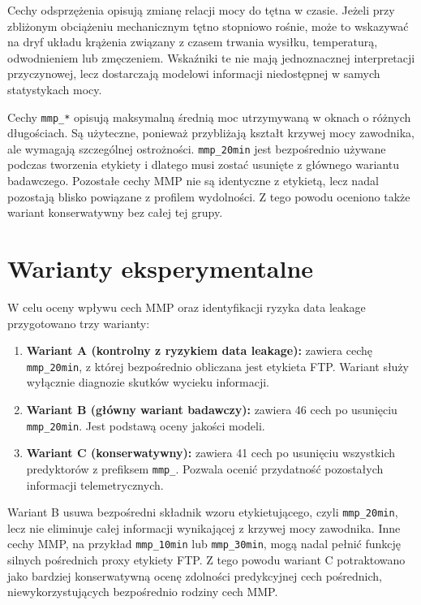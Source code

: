 Cechy odsprzężenia opisują zmianę relacji mocy do tętna w czasie. Jeżeli przy zbliżonym obciążeniu mechanicznym tętno stopniowo rośnie, może to wskazywać na dryf układu krążenia związany z czasem trwania wysiłku, temperaturą, odwodnieniem lub zmęczeniem. Wskaźniki te nie mają jednoznacznej interpretacji przyczynowej, lecz dostarczają modelowi informacji niedostępnej w samych statystykach mocy.

Cechy \texttt{mmp\_*} opisują maksymalną średnią moc utrzymywaną w oknach o różnych długościach. Są użyteczne, ponieważ przybliżają kształt krzywej mocy zawodnika, ale wymagają szczególnej ostrożności. \texttt{mmp\_20min} jest bezpośrednio używane podczas tworzenia etykiety i dlatego musi zostać usunięte z głównego wariantu badawczego. Pozostałe cechy MMP nie są identyczne z etykietą, lecz nadal pozostają blisko powiązane z profilem wydolności. Z tego powodu oceniono także wariant konserwatywny bez całej tej grupy.

\section{Warianty eksperymentalne}

W celu oceny wpływu cech MMP oraz identyfikacji ryzyka data leakage przygotowano trzy warianty:
\begin{enumerate}
    \item \textbf{Wariant A (kontrolny z ryzykiem data leakage):} zawiera cechę \texttt{mmp\_20min}, z której bezpośrednio obliczana jest etykieta FTP. Wariant służy wyłącznie diagnozie skutków wycieku informacji.
    \item \textbf{Wariant B (główny wariant badawczy):} zawiera 46 cech po usunięciu \texttt{mmp\_20min}. Jest podstawą oceny jakości modeli.
    \item \textbf{Wariant C (konserwatywny):} zawiera 41 cech po usunięciu wszystkich predyktorów z prefiksem \texttt{mmp\_}. Pozwala ocenić przydatność pozostałych informacji telemetrycznych.
\end{enumerate}

Wariant B usuwa bezpośredni składnik wzoru etykietującego, czyli \texttt{mmp\_20min}, lecz nie eliminuje całej informacji wynikającej z krzywej mocy zawodnika. Inne cechy MMP, na przykład \texttt{mmp\_10min} lub \texttt{mmp\_30min}, mogą nadal pełnić funkcję silnych pośrednich proxy etykiety FTP. Z tego powodu wariant C potraktowano jako bardziej konserwatywną ocenę zdolności predykcyjnej cech pośrednich, niewykorzystujących bezpośrednio rodziny cech MMP.

